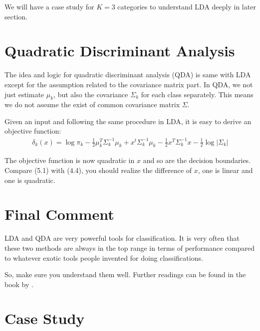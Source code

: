 \documentclass[12pt]{article}
\theoremstyle{definition}
\numberwithin{equation}{section}
\numberwithin{figure}{section}
\numberwithin{table}{section}
\begin{document}
We will have a case study for $K=3$ categories to understand LDA deeply in later section. 

\section{Quadratic Discriminant Analysis}

The idea and logic for quadratic discriminant analysis (QDA) is same with LDA except for the assumption related to the covariance matrix part. In QDA, we not just estimate $\mu_k$, but also the covariance $\Sigma_k$ for each class separately. This means we do not assume the exist of common covariance matrix $\Sigma$.

Given an input and following the same procedure in LDA, it is easy to derive an objective function:
\begin{align}
	\delta_k(x) = \log \pi_k - \frac{1}{2} \mu_k^T \Sigma_{k}^{-1} \mu_k + x^t \Sigma_{k}^{-1} \mu_k - \frac{1}{2} x^T \Sigma_{k}^{-1}x - \frac{1}{2} \log |\Sigma_{k} |
\end{align}

The objective function is now quadratic in $x$ and so are the decision boundaries. Compare (5.1) with (4.4), you should realize the difference of $x$, one is linear and one is quadratic. 


\section{Final Comment}

LDA and QDA are very powerful tools for classification. It is very often that these two methods are always in the top range in terms of performance compared to whatever exotic tools people invented for doing classifications. 

So, make sure you understand them well. Further readings can be found in the book by \cite{friedman2001elements}. 


\section{Case Study}














\end{document}
